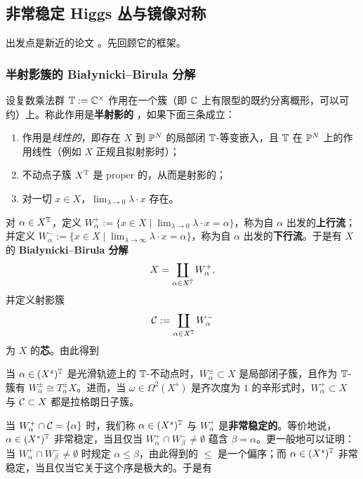 \subsection{非常稳定 Higgs 丛与镜像对称}

出发点是新近的论文 \cite{hausel-hitchin}。先回顾它的框架。

\subsubsection{半射影簇的 Białynicki--Birula 分解}

设复数乘法群 $\T:=\C^\times$ 作用在一个簇（即 $\C$ 上有限型的既约分离概形，可以可约）上。称此作用是\textbf{半射影的} \cite[\S 1]{hausel-large}，如果下面三条成立：

\begin{enumerate}
	\item 作用是\emph{线性的}，即存在 $X$ 到 $\P^N$ 的局部闭 $\T$-等变嵌入，且 $\T$ 在 $\P^N$ 上的作用线性（例如 $X$ 正规且拟射影时）；
	\item 不动点子簇 $X^\T$ 是 proper 的，从而是射影的；
	\item 对一切 $x\in X$，$\lim_{\lambda\to 0} \lambda\cdot x$ 存在。
\end{enumerate}
对 $\alpha\in X^\T$，定义 $W^+_\alpha:=\{x\in X\mid \lim_{\lambda\to 0} \lambda\cdot x = \alpha\}$，称为自 $\alpha$ 出发的\textbf{上行流}；并定义 $W^-_\alpha:=\{x\in X\mid \lim_{\lambda\to \infty} \lambda\cdot x = \alpha\}$，称为自 $\alpha$ 出发的\textbf{下行流}。于是有 $X$ 的 \textbf{Białynicki--Birula 分解}
\[
X=\coprod_{\alpha\in X^\T} W_\alpha^+,
\]
并定义射影簇
\[
\calC:=\coprod_{\alpha\in X^\T} W_\alpha^-
\]
为 $X$ 的\textbf{芯}。由此得到

\begin{theorem}
当 $\alpha\in (X^s)^\T$ 是光滑轨迹上的 $\T$-不动点时，$W^{\pm}_\alpha\subset X$ 是局部闭子簇，且作为 $\T$-簇有 $W^{\pm}_\alpha\cong T^{\pm}_\alpha X$。进而，当 $\omega\in \Omega^2(X^s)$ 是齐次度为 $1$ 的辛形式时，$W^+_\alpha\subset X$ 与 $\calC\subset X$ 都是拉格朗日子簇。
\end{theorem}

当 $W^+_\alpha\cap \calC =\{\alpha\}$ 时，我们称 $\alpha\in (X^s)^\T$ 与 $W^+_\alpha$ 是\textbf{非常稳定的}。等价地说，$\alpha\in (X^s)^\T$ 非常稳定，当且仅当 $W^+_\alpha\cap W_\beta^-\neq \emptyset$ 蕴含 $\beta=\alpha$。更一般地可以证明：当 $W^+_\alpha\cap W_\beta^-\neq \emptyset$ 时规定 $\alpha\leq \beta$，由此得到的 $\leq$ 是一个偏序；而 $\alpha\in (X^s)^\T$ 非常稳定，当且仅当它关于这个序是极大的。于是有


